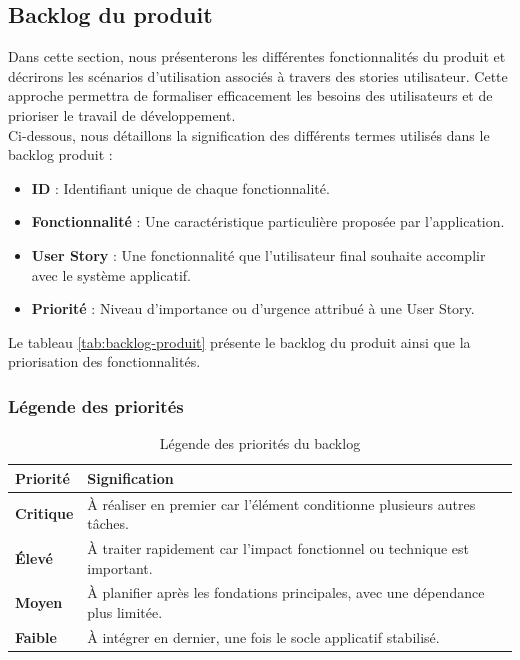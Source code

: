 \subsection{Backlog du produit}
Dans cette section, nous présenterons les différentes fonctionnalités du produit et décrirons les scénarios d'utilisation associés à travers des stories utilisateur. Cette approche permettra de formaliser efficacement les besoins des utilisateurs et de prioriser le travail de développement.\\
Ci-dessous, nous détaillons la signification des différents termes utilisés dans le backlog produit :
\begin{itemize}
  \item \textbf{ID} : Identifiant unique de chaque fonctionnalité.
  \item \textbf{Fonctionnalité} : Une caractéristique particulière proposée par l'application.
  \item \textbf{User Story} : Une fonctionnalité que l'utilisateur final souhaite accomplir avec le système applicatif.
  \item \textbf{Priorité} : Niveau d'importance ou d'urgence attribué à une User Story.
\end{itemize}
Le tableau \ref{tab:backlog-produit} présente le backlog du produit ainsi que la priorisation des fonctionnalités.

\subsubsection{Légende des priorités}
\begin{table}[H]
  \centering
  \caption{Légende des priorités du backlog}
  \label{tab:legende-priorites-backlog}
  \renewcommand{\arraystretch}{1.2}
  \begin{tabular}{|p{3cm}|p{10cm}|}
    \hline
    \textbf{Priorité}                           & \textbf{Signification}                                                          \\
    \hline
    \cellcolor{niveauCritique}\textbf{Critique} & À réaliser en premier car l'élément conditionne plusieurs autres tâches.        \\
    \hline
    \cellcolor{niveauEleve}\textbf{Élevé}       & À traiter rapidement car l'impact fonctionnel ou technique est important.       \\
    \hline
    \cellcolor{niveauMoyen}\textbf{Moyen}       & À planifier après les fondations principales, avec une dépendance plus limitée. \\
    \hline
    \cellcolor{niveauFaible}\textbf{Faible}     & À intégrer en dernier, une fois le socle applicatif stabilisé.                  \\
    \hline
  \end{tabular}
\end{table}

